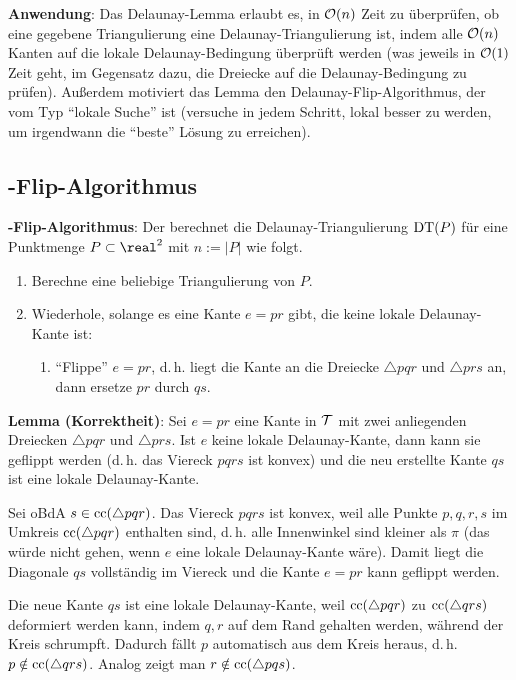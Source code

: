 \linie

\textbf{Anwendung}:
Das Delaunay-Lemma erlaubt es, in $\mathcal{O}(n)$ Zeit zu überprüfen, ob eine gegebene Triangulierung
eine Delaunay-Triangulierung ist, indem alle
$\mathcal{O}(n)$ Kanten auf die lokale Delaunay-Bedingung überprüft werden
(was jeweils in $\mathcal{O}(1)$ Zeit geht,
im Gegensatz dazu, die Dreiecke auf die Delaunay-Bedingung zu prüfen).
Außerdem motiviert das Lemma den Delaunay-Flip-Algorithmus, der vom Typ "`lokale Suche"' ist
(versuche in jedem Schritt, lokal besser zu werden, um irgendwann die "`beste"' Lösung zu
erreichen).

\pagebreak

\subsection{%
    -Flip-Algorithmus%
}

\textbf{-Flip-Algorithmus}:
Der  berechnet die Delaunay-Triangulierung $\operatorname{DT}(P)$
für eine Punktmenge $P \subset \real^2$ mit $n := |P|$ wie folgt.
\begin{enumerate}
    \item
    Berechne eine beliebige Triangulierung von $P$.

    \item
    Wiederhole, solange es eine Kante $e = pr$ gibt, die keine lokale Delaunay-Kante ist:
    \begin{enumerate}
        \item
        "`Flippe"' $e = pr$,
        d.\,h. liegt die Kante an die Dreiecke $\triangle pqr$ und $\triangle prs$ an,
        dann ersetze $pr$ durch $qs$.
    \end{enumerate}
\end{enumerate}

\linie

\textbf{Lemma (Korrektheit)}:
Sei $e = pr$ eine Kante in $\mathcal{T}$ mit zwei anliegenden Dreiecken $\triangle pqr$ und $\triangle prs$.
Ist $e$ keine lokale Delaunay-Kante, dann kann sie geflippt werden
(d.\,h. das Viereck $pqrs$ ist konvex)
und die neu erstellte Kante $qs$ ist eine lokale Delaunay-Kante.

\begin{Beweis}
    Sei oBdA $s \in \operatorname{cc}(\triangle pqr)$.
    Das Viereck $pqrs$ ist konvex, weil alle Punkte $p, q, r, s$ im Umkreis $\operatorname{cc}(\triangle pqr)$
    enthalten sind, d.\,h. alle Innenwinkel sind kleiner als $\pi$
    (das würde nicht gehen, wenn $e$ eine lokale Delaunay-Kante wäre).
    Damit liegt die Diagonale $qs$ vollständig im Viereck und die Kante $e = pr$ kann geflippt
    werden.

    Die neue Kante $qs$ ist eine lokale Delaunay-Kante, weil $\operatorname{cc}(\triangle pqr)$ zu
    $\operatorname{cc}(\triangle qrs)$ deformiert werden kann, indem $q, r$ auf dem Rand gehalten werden,
    während der Kreis schrumpft.
    Dadurch fällt $p$ automatisch aus dem Kreis heraus, d.\,h. $p \notin \operatorname{cc}(\triangle qrs)$.
    Analog zeigt man $r \notin \operatorname{cc}(\triangle pqs)$.
\end{Beweis}

